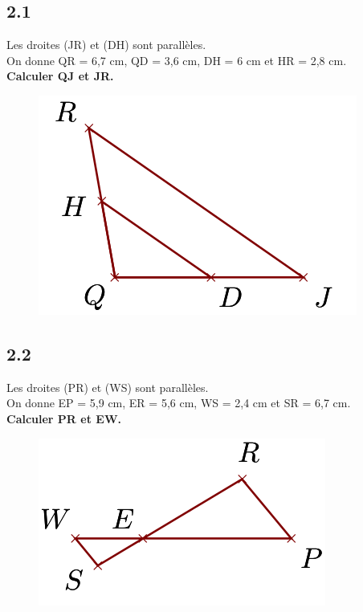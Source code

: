 \documentclass[12pt]{article}
\begin{document}
\begin{multicols}{2}

  \subsection*{2.1}

  \begin{multicols}{2}

    Les droites (JR) et (DH) sont parallèles.\\
    On donne QR = 6,7 cm, QD = 3,6 cm, DH = 6 cm et HR = 2,8 cm.\\
    \textbf{Calculer QJ et JR.}
    \begin{figure}[H]
      \centering
      \includegraphics[width=.5\linewidth]{4x6-thales/sources/th1.png}
    \end{figure}

  \end{multicols}

  \subsection*{2.2}
  \begin{multicols}{2}
    Les droites (PR) et (WS) sont parallèles.\\
    On donne EP = 5,9 cm, ER = 5,6 cm, WS = 2,4 cm et SR = 6,7 cm.\\
    \textbf{Calculer PR et EW.}
    \begin{figure}[H]
      \centering
      \includegraphics[width=.5\linewidth]{4x6-thales/sources/th2.png}
    \end{figure}
  \end{multicols}



\end{multicols}
\end{document}
